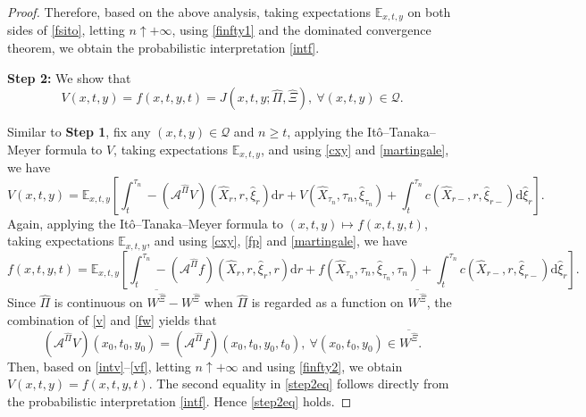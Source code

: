 \documentclass[10pt,a4paper]{amsart}
\begin{document}
\begin{proof}
Therefore, based on the above analysis, taking expectations $\mathbb{E}_{x,t,y}$ on both sides of \eqref{fsito}, letting $n\uparrow+\infty$, using \eqref{finfty1} and the dominated convergence theorem, we obtain the probabilistic interpretation \eqref{intf}.

{\bf Step 2:} We show that
\begin{equation}
\label{step2eq}
V(x,t,y)=f(x,t,y,t)=J\left(x,t,y;\hat{\Pi},\hat{\Xi}\right),\ \forall(x,t,y)\in\mathcal{Q}.
\end{equation}

Similar to {\bf Step 1}, fix any $(x,t,y)\in\mathcal{Q}$ and $n\ge t$, applying the It\^{o}--Tanaka--Meyer formula to $V$, taking expectations $\mathbb{E}_{x,t,y}$, and using \eqref{cxy} and \eqref{martingale}, we have 
\begin{equation}
\label{intv}
V(x,t,y)=\mathbb{E}_{x,t,y}\left[\int_t^{\tau_{n}} -\left(\mathcal{A}^{\hat\Pi}V\right)\left(\hat{X}_r, r, \hat{\xi}_r \right) \mathrm{d} r+V\left(\hat{X}_{\tau_{n}}, \tau_{n},\hat{\xi}_{\tau_{n}}\right)+\int_t^{\tau_{n}} c\left(\hat{X}_{r-}, r, \hat{\xi}_{r-}\right) \mathrm{d} \hat{\xi}_r \right].
\end{equation}
Again, applying the It\^{o}--Tanaka--Meyer formula to $(x,t,y)\mapsto f(x,t,y,t)$, taking expectations $\mathbb{E}_{x,t,y}$, and using \eqref{cxy}, \eqref{fp} and \eqref{martingale}, we have
\begin{equation}
\label{intft}
f(x,t,y,t)=\mathbb{E}_{x,t,y}\left[\int_t^{\tau_{n}} -\left(\mathcal{A}^{\hat\Pi}f\right)\left(\hat{X}_r, r, \hat{\xi}_r,r \right) \mathrm{d} r+ f\left(\hat{X}_{\tau_{n}}, \tau_{n},\hat{\xi}_{\tau_{n}},\tau_{n}\right)+\int_t^{\tau_{n}} c\left(\hat{X}_{r-}, r, \hat{\xi}_{r-}\right) \mathrm{d} \hat{\xi}_r \right].
\end{equation}
Since $\hat{\Pi}$ is continuous on $\overline{W^{\hat{\Xi}}}-W^{\hat{\Xi}}$  when $\hat{\Pi}$ is regarded as a function on $\overline{W^{\hat{\Xi}}}$, the combination of \eqref{v} and \eqref{fw} yields that
\begin{equation}
\label{vf}
\left(\mathcal{A}^{\hat\Pi}V\right)(x_0,t_0,y_0)=\left(\mathcal{A}^{\hat\Pi}f\right)(x_0,t_0,y_0,t_0),\ \forall (x_0,t_0,y_0)\in \overline{W^{\hat{\Xi}}}.
\end{equation}
Then, based on \eqref{intv}--\eqref{vf}, letting $n\uparrow+\infty$ and using \eqref{finfty2}, we obtain $V(x,t,y)=f(x,t,y,t)$. The second equality in \eqref{step2eq} follows directly from the probabilistic interpretation \eqref{intf}. Hence \eqref{step2eq} holds.


\end{proof}
\end{document}
